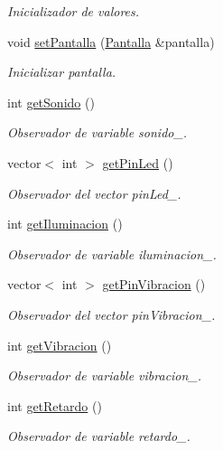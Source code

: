 \begin{DoxyCompactItemize}
\begin{DoxyCompactList}\small\item\em Inicializador de valores. \end{DoxyCompactList}\item 
void \hyperlink{classInteraccion_ad6db2ac6c70998f627af94fff1733372}{set\+Pantalla} (\hyperlink{classPantalla}{Pantalla} \&pantalla)
\begin{DoxyCompactList}\small\item\em Inicializar pantalla. \end{DoxyCompactList}\item 
int \hyperlink{classInteraccion_a2dea5d3d96252712556e7d8ca5609544}{get\+Sonido} ()
\begin{DoxyCompactList}\small\item\em Observador de variable sonido\+\_\+. \end{DoxyCompactList}\item 
vector$<$ int $>$ \hyperlink{classInteraccion_a048731e6be4184f31ecd21cd443f36dc}{get\+Pin\+Led} ()
\begin{DoxyCompactList}\small\item\em Observador del vector pin\+Led\+\_\+. \end{DoxyCompactList}\item 
int \hyperlink{classInteraccion_a1f36975ed2a6163b6ae16f56edcc4285}{get\+Iluminacion} ()
\begin{DoxyCompactList}\small\item\em Observador de variable iluminacion\+\_\+. \end{DoxyCompactList}\item 
vector$<$ int $>$ \hyperlink{classInteraccion_a198693ea80bcfaaf34e68b5f67e989f5}{get\+Pin\+Vibracion} ()
\begin{DoxyCompactList}\small\item\em Observador del vector pin\+Vibracion\+\_\+. \end{DoxyCompactList}\item 
int \hyperlink{classInteraccion_acd8df89de11bdfbc666361442be61074}{get\+Vibracion} ()
\begin{DoxyCompactList}\small\item\em Observador de variable vibracion\+\_\+. \end{DoxyCompactList}\item 
int \hyperlink{classInteraccion_ac4eedd10ae26a85e19c421d3f8024996}{get\+Retardo} ()
\begin{DoxyCompactList}\small\item\em Observador de variable retardo\+\_\+. \end{DoxyCompactList}\item 

\end{DoxyCompactItemize}
